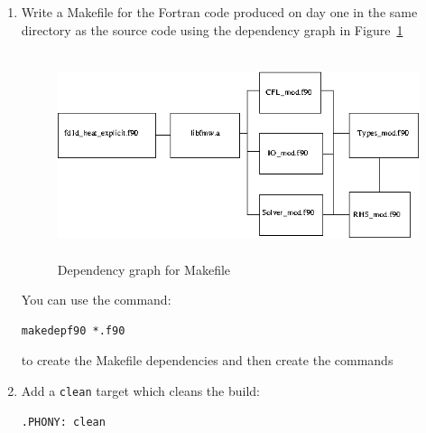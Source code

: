 \documentclass[12pt]{article}
\begin{document}
\begin{enumerate}
\item Write a Makefile for the Fortran code produced on day one in the same directory as the source
  code using the dependency graph in Figure~\ref{make_depend:eps}
\begin{figure}[H]
\includegraphics[height=6cm]{make_depend.png}
\caption{Dependency graph for Makefile}
\label{make_depend:eps}
\end{figure}
You can use the command:
\begin{verbatim}
makedepf90 *.f90
\end{verbatim}
to create the Makefile dependencies and then create the commands
\item Add a \texttt{clean} target which cleans the build:
\begin{verbatim}
.PHONY: clean


\end{verbatim}
\end{enumerate}
\end{document}
